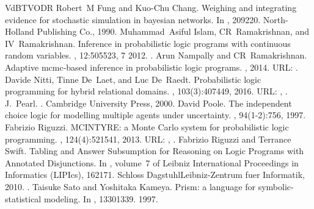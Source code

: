 \documentclass[letterpaper,10pt,english]{sphinxmanual}
\begin{document}
\begin{sphinxthebibliography}{VdBTVODR}
Robert M Fung and Kuo-Chu Chang. Weighing and integrating evidence for stochastic simulation in bayesian networks. In , 209\textendash{}220. North-Holland Publishing Co., 1990.
Muhammad Asiful Islam, CR Ramakrishnan, and IV Ramakrishnan. Inference in probabilistic logic programs with continuous random variables. , 12:505\textendash{}523, 7 2012. .
Arun Nampally and CR Ramakrishnan. Adaptive mcmc-based inference in probabilistic logic programs. , 2014. URL: .
Davide Nitti, Tinne De Laet, and Luc De Raedt. Probabilistic logic programming for hybrid relational domains. , 103(3):407\textendash{}449, 2016. URL: , .
J. Pearl. . Cambridge University Press, 2000.
David Poole. The independent choice logic for modelling multiple agents under uncertainty. , 94(1-2):7\textendash{}56, 1997.
Fabrizio Riguzzi. MCINTYRE: a Monte Carlo system for probabilistic logic programming. , 124(4):521\textendash{}541, 2013. URL: , .
Fabrizio Riguzzi and Terrance Swift. Tabling and Answer Subsumption for Reasoning on Logic Programs with Annotated Disjunctions. In , volume 7 of Leibniz International Proceedings in Informatics (LIPIcs), 162\textendash{}171. Schloss Dagstuhl\textendash{}Leibniz-Zentrum fuer Informatik, 2010. .
Taisuke Sato and Yoshitaka Kameya. Prism: a language for symbolic-statistical modeling. In , 1330\textendash{}1339. 1997.

\end{sphinxthebibliography}
\end{document}
